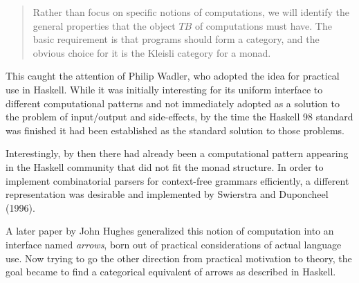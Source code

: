 \begin{quote}
Rather than focus on specific notions of computations, we will identify the
general properties that the object $TB$ of computations must have. The basic
requirement is that programs should form a category, and the obvious choice for
it is the Kleisli category for a monad.
\end{quote}

This caught the attention of Philip Wadler, who adopted the idea for practical
use in Haskell\smartcite[p. 12-23]{hask-history}. While it was initially
interesting for its uniform interface to different computational patterns and
not immediately adopted as a solution to the problem of input/output and
side-effects, by the time the Haskell 98 standard was finished it had been
established as the standard solution to those problems.

Interestingly, by then there had already been a computational pattern
appearing in the Haskell community that did not fit the monad structure.
In order to implement combinatorial parsers for context-free grammars
efficiently, a different representation was desirable and implemented by
Swierstra and Duponcheel (1996).

A later paper by John Hughes generalized this notion of computation into
an interface named \emph{arrows}, born out of practical considerations
of actual language use. Now trying to go the other direction from
practical motivation to theory, the goal became to find a categorical
equivalent of arrows as described in Haskell.

%
%
